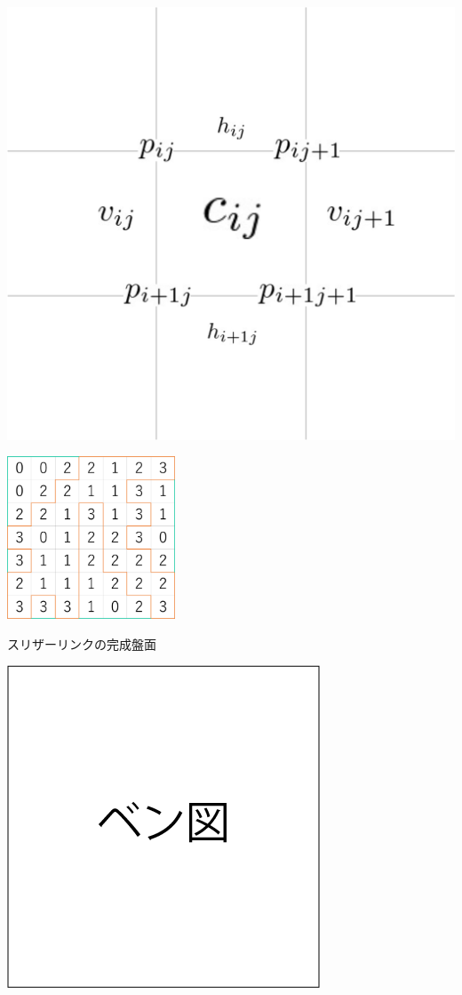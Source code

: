 \begin{clearpagefigure}
  \includegraphics[width=0.8\linewidth,clip]{fig/define.png}
  \caption{}
  \label{figure:VariableAtBoard}
\end{clearpagefigure}

\begin{clearpagefigure}
  \includegraphics[width=5cm]{fig/slitherlink.png}
  \caption{スリザーリンクの完成盤面}
\end{clearpagefigure}

\begin{clearpagefigure}
  \includegraphics[width=0.8\linewidth,clip]{fig/vennDiagram.png}
  \caption{}
  \label{figure:VennDiagram}
\end{clearpagefigure}

